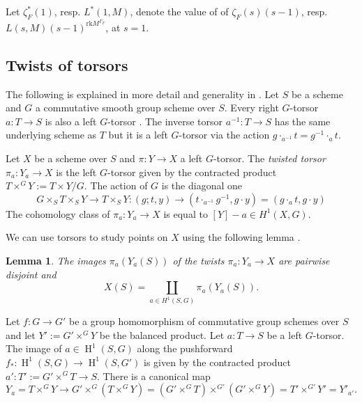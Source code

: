 \documentclass[a4paper,11pt,reqno]{amsart}
\DeclareMathOperator{\HH}{H}
\newtheorem{lemma}[theorem]{Lemma}
\theoremstyle{definition}
\begin{document}
Let $\zeta^*_F(1)$, resp. $L^*(1, M)$, denote the value of of $\zeta_F(s)(s - 1)$, resp. $L(s, M)(s - 1)^{\text{rk} M^{\Gamma_F}}$, at $s = 1$.
\subsection{Twists of torsors}
The following is explained in more detail and generality in \cite[\S 2.2]{Skorogobatov2001Torsors}. Let $S$ be a scheme and $G$ a commutative smooth group scheme over $S$. Every right $G$-torsor $a:T \to S$ is also a left $G$-torsor \cite[p. 13]{Skorogobatov2001Torsors}. The inverse torsor $a^{-1}: T \to S$ has the same underlying scheme as $T$ but it is a left $G$-torsor via the action $g \cdot_{a^{-1}} t = g^{-1} \cdot_{a} t$.

Let $X$ be a scheme over $S$ and $\pi:Y \to X$ a left $G$-torsor. The \emph{twisted torsor} \cite[p.20, Ex. 2]{Skorogobatov2001Torsors} $\pi_{a}: Y_{a} \to X$ is the left $G$-torsor given by the contracted product $T \times^G Y := T \times Y/ G$. The action of $G$ is the diagonal one 
\begin{equation*}
	G \times_S T \times_S Y \to T \times_S Y : (g; t, y) \to (t \cdot_{a^{-1}} g^{-1}, g \cdot y) = (g \cdot_{a} t, g \cdot y)
\end{equation*}
The cohomology class of $\pi_{a}: Y_{a} \to X$ is equal to $[Y] - a \in H^1(X, G)$.

We can use torsors to study points on $X$ using the following lemma \cite[Thm.~8.4.1]{Poonen2017Rational}.
\begin{lemma}
	The images $\pi_{a}(Y_{a}(S))$ of the twists $\pi_{a}: Y_{a} \to X$ are pairwise disjoint and 
	\begin{equation*}
		X(S) = \coprod_{a \in H^1(S, G)}\pi_{a}(Y_{a}(S)).
	\end{equation*}
	\label{Points on the base and on the torsor}
\end{lemma}

Let $f: G \to G'$ be a group homomorphism of commutative group schemes over $S$ and let $Y' := G' \times^G Y$ be the balanced product. Let $a: T \to S$ be a left $G$-torsor. The image of $a \in \HH^1(S, G)$ along the pushforward $f_*: \HH^1(S, G) \to \HH^1(S, G')$ is given by the contracted product $a': T' := G' \times^G T \to S$. There is a canonical map
\begin{equation}
	Y_a = T \times^G Y \to G' \times^G (T \times^G Y) = (G' \times^G T) \times^{G'} (G' \times^G Y)= T' \times^{G'} Y' = Y'_{a'}.
	\label{Functoriality of points on torsors}
\end{equation}
\end{document}
